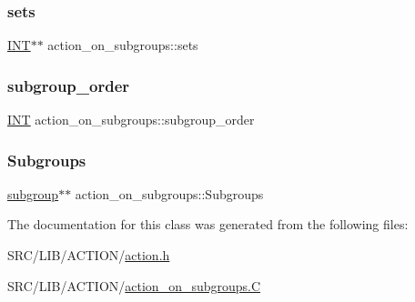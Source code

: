 \subsubsection{\texorpdfstring{sets}{sets}}
{\footnotesize\ttfamily \mbox{\hyperlink{galois_8h_a09fddde158a3a20bd2dcadb609de11dc}{I\+NT}}$\ast$$\ast$ action\+\_\+on\+\_\+subgroups\+::sets}

\mbox{\label{classaction__on__subgroups_ad8b26fa522fdfd4d41f31b41c79ef7e5}} 
\subsubsection{\texorpdfstring{subgroup\+\_\+order}{subgroup\_order}}
{\footnotesize\ttfamily \mbox{\hyperlink{galois_8h_a09fddde158a3a20bd2dcadb609de11dc}{I\+NT}} action\+\_\+on\+\_\+subgroups\+::subgroup\+\_\+order}

\mbox{\label{classaction__on__subgroups_a8b6b08b81e27df0cd045dc7f230c2279}} 
\subsubsection{\texorpdfstring{Subgroups}{Subgroups}}
{\footnotesize\ttfamily \mbox{\hyperlink{classsubgroup}{subgroup}}$\ast$$\ast$ action\+\_\+on\+\_\+subgroups\+::\+Subgroups}



The documentation for this class was generated from the following files\+:\begin{DoxyCompactItemize}
\item 
S\+R\+C/\+L\+I\+B/\+A\+C\+T\+I\+O\+N/\mbox{\hyperlink{action_8h}{action.\+h}}\item 
S\+R\+C/\+L\+I\+B/\+A\+C\+T\+I\+O\+N/\mbox{\hyperlink{action__on__subgroups_8_c}{action\+\_\+on\+\_\+subgroups.\+C}}\end{DoxyCompactItemize}
